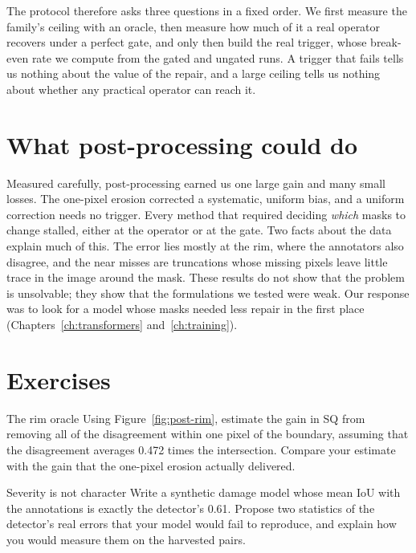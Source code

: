 The protocol therefore asks three questions in a fixed order. We first measure the family's
ceiling with an oracle, then measure how much of it a real operator recovers under a perfect gate,
and only then build the real trigger, whose break-even rate we compute from the gated and ungated
runs. A trigger that fails tells us nothing about the value of the repair, and a large ceiling tells
us nothing about whether any practical operator can reach it.

\section{What post-processing could do}\label{sec:post-summary}
Measured carefully, post-processing earned us one large gain and many small losses. The one-pixel
erosion corrected a systematic, uniform bias, and a uniform correction needs no trigger. Every method
that required deciding \emph{which} masks to change stalled, either at the operator or at the gate.
Two facts about the data explain much of this. The error lies mostly at the rim, where the annotators
also disagree, and the near misses are truncations whose missing pixels leave little trace in the
image around the mask. These results do not show that the problem is unsolvable; they show that the
formulations we tested were weak. Our response was to look for a model whose masks needed less repair
in the first place (Chapters~\ref{ch:transformers} and~\ref{ch:training}).

\section*{Exercises}
\begin{exercise}{The rim oracle}
Using Figure~\ref{fig:post-rim}, estimate the gain in SQ from removing all of the disagreement within
one pixel of the boundary, assuming that the disagreement averages 0.472 times the intersection.
Compare your estimate with the gain that the one-pixel erosion actually delivered.
\end{exercise}

\begin{exercise}{Severity is not character}
Write a synthetic damage model whose mean IoU with the annotations is exactly the detector's 0.61.
Propose two statistics of the detector's real errors that your model would fail to reproduce, and
explain how you would measure them on the harvested pairs.
\end{exercise}

